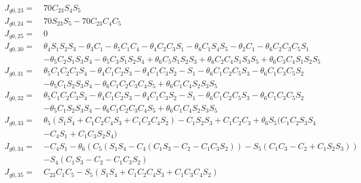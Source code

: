 \begin{equation*}
\begin{split}
J_{g0,23} =\  &70C_{23}S_4S_5\\
J_{g0,24} =\  &70S_{23}S_5 - 70C_{23}C_4C_5\\
J_{g0,25} =\  &0\\
J_{g0,30} =\  &\theta _4S_1S_2S_3 - \theta _3C_1 - \theta _5C_1C_4 - \theta _4C_2C_3S_1 - \theta _6C_1S_4S_5 - \theta _2C_1 - \theta _6C_2C_3C_5S_1\\
		 	  &- \theta _5C_2S_1S_3S_4 - \theta _5C_3S_1S_2S_4 + \theta _6C_5S_1S_2S_3 + \theta _6C_2C_4S_1S_3S_5 + \theta _6C_3C_4S_1S_2S_5\\
J_{g0,31} =\  &\theta _5C_1C_2C_3S_4 - \theta _4C_1C_2S_3 - \theta _4C_1C_3S_2 - S_1 - \theta _6C_1C_2C_5S_3 - \theta _6C_1C_3C_5S_2\\
		 	  &- \theta _5C_1S_2S_3S_4 - \theta _6C_1C_2C_3C_4S_5 + \theta _6C_1C_4S_2S_3S_5\\
J_{g0,32} =\  &\theta _5C_1C_2C_3S_4 - \theta _4C_1C_2S_3 - \theta _4C_1C_3S_2 - S_1 - \theta _6C_1C_2C_5S_3 - \theta _6C_1C_3C_5S_2\\
			  &- \theta _5C_1S_2S_3S_4 - \theta _6C_1C_2C_3C_4S_5 + \theta _6C_1C_4S_2S_3S_5\\
J_{g0,33} =\  &\theta _5(S_1S_4 + C_1C_2C_4S_3 + C_1C_3C_4S_2) - C_1S_2S_3 + C_1C_2C_3 + \theta _6S_5(C_1C_2S_3S_4\\
			  &- C_4S_1 + C_1C_3S_2S_4)\\
J_{g0,34} =\  &- C_4S_1 - \theta _6(C_5(S_1S_4 - C_4(C_1S_3-C_2 - C_1C_3S_2)) - S_5(C_1C_3-C_2 + C_1S_2S_3))\\
			  &- S_4(C_1S_3-C_2 - C_1C_3S_2)\\
J_{g0,35} =\  &C_{23}C_1C_5 - S_5(S_1S_4 + C_1C_2C_4S_3 + C_1C_3C_4S_2)\\
\end{split}
\end{equation*}
